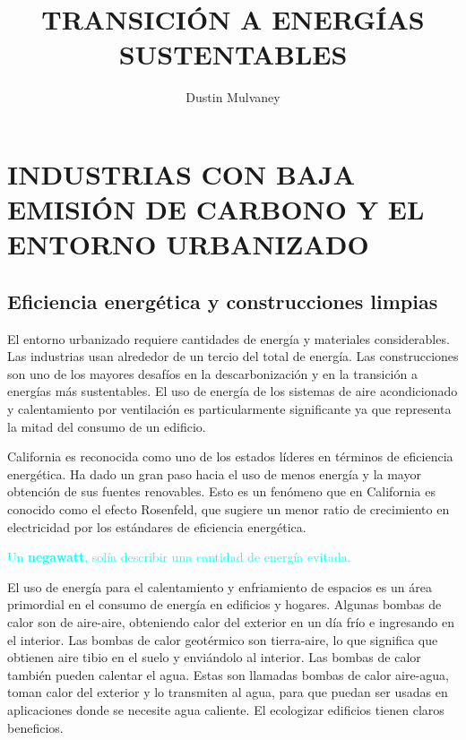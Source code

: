 \documentclass[runningheads]{llncs}
\begin{document}
%
\title{TRANSICIÓN A ENERGÍAS SUSTENTABLES}
%
%
\author{Dustin Mulvaney}
\maketitle
\setcounter{section}{8}
\section{INDUSTRIAS CON BAJA EMISIÓN DE CARBONO Y EL ENTORNO URBANIZADO}
\subsection{Eficiencia energética y construcciones limpias}

El entorno urbanizado requiere cantidades de energía y materiales considerables. Las industrias usan alrededor de un tercio del total de energía. Las construcciones son uno de los mayores desafíos en la descarbonización y en la transición a energías más sustentables. El uso de energía de los sistemas de aire acondicionado y calentamiento por ventilación es particularmente significante ya que representa la mitad del consumo de un edificio.

California es reconocida como uno de los estados líderes en términos de eficiencia energética. Ha dado un gran paso hacia el uso de menos energía y la mayor obtención de sus fuentes renovables. Esto es un fenómeno que en California es conocido como el efecto Rosenfeld, que sugiere un menor ratio de crecimiento en electricidad por los estándares de eficiencia energética.
\begin{center}
\textcolor{cyan}{Un \textbf{negawatt}, solía describir una cantidad de energía evitada.}\end{center}

El uso de energía para el calentamiento y enfriamiento de espacios es un área primordial en el consumo de energía en edificios y hogares. Algunas bombas de calor son de aire-aire, obteniendo calor del exterior en un día frío e ingresando en el interior. Las bombas de calor geotérmico son tierra-aire, lo que significa que obtienen aire tibio en el suelo y enviándolo al interior. Las bombas de calor también pueden calentar el agua. Estas son llamadas bombas de calor aire-agua, toman calor del exterior y lo transmiten al agua, para que puedan ser usadas en aplicaciones donde se necesite agua caliente. El ecologizar edificios tienen claros beneficios.
\end{document}
